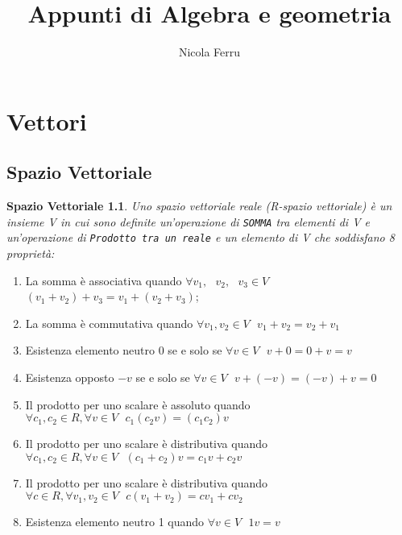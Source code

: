 \documentclass{book}
\title{Appunti di Algebra e geometria}
\author{Nicola Ferru}
\date{}
\begin{document}
\maketitle
\tableofcontents
\listoftables
\listoffigures


\chapter{Vettori}
\section{Spazio Vettoriale}
\newtheorem{SpaVet}{Spazio Vettoriale}
\begin{SpaVet}
	Uno spazio vettoriale reale (R-spazio vettoriale) è un insieme \textit{V} in
	cui sono definite un'operazione di \texttt{SOMMA} tra elementi di
	\textit{V} e un'operazione di \texttt{Prodotto tra un reale} e un elemento
	di V che soddisfano 8 proprietà:
\end{SpaVet}
\begin{enumerate}
	\item La somma è associativa quando $\forall v_1, \text{ } v_2, \text{ } v_3 
		\in V$ $\left(v_1+v_2\right)+v_3=v_1+\left(v_2+v_3\right)$;
	\item La somma è commutativa quando $\forall v_1, v_2 \in V\text{ }
		v_1+v_2=v_2+v_1$
	\item Esistenza elemento neutro 0 se e solo se $\forall v\in V \text{ }
		v+0=0+v=v$
	\item Esistenza opposto $-v$ se e solo se $\forall v \in V \text{ }
		v+(-v)=(-v)+v=0$
	\item Il prodotto per uno scalare è assoluto quando $\forall c_1,c_2 \in
		R, \forall v\in V \text{ } c_1(c_2v)=(c_1c_2)v$
	\item Il prodotto per uno scalare è distributiva quando $\forall c_1,c_2 \in
		R, \forall v\in V \text{ } (c_1+c_2)v=c_1v+c_2v$
	\item Il prodotto per uno scalare è distributiva quando $\forall c \in
		R, \forall v_1, v_2\in V \text{ }c(v_1+v_2)=cv_1+cv_2$
	\item Esistenza elemento neutro 1 quando $\forall v\in V \text{ } 1v=v$
\end{enumerate}
\end{document}
